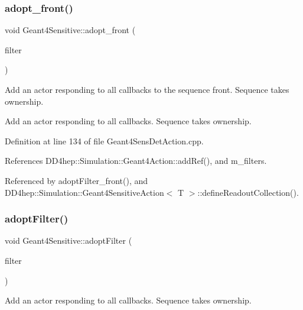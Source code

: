 \subsubsection{\texorpdfstring{adopt\+\_\+front()}{adopt\_front()}}
{\footnotesize\ttfamily void Geant4\+Sensitive\+::adopt\+\_\+front (\begin{DoxyParamCaption}\item[{\hyperlink{class_d_d4hep_1_1_simulation_1_1_geant4_filter}{Geant4\+Filter} $\ast$}]{filter }\end{DoxyParamCaption})}



Add an actor responding to all callbacks to the sequence front. Sequence takes ownership. 

Add an actor responding to all callbacks. Sequence takes ownership. 

Definition at line 134 of file Geant4\+Sens\+Det\+Action.\+cpp.



References D\+D4hep\+::\+Simulation\+::\+Geant4\+Action\+::add\+Ref(), and m\+\_\+filters.



Referenced by adopt\+Filter\+\_\+front(), and D\+D4hep\+::\+Simulation\+::\+Geant4\+Sensitive\+Action$<$ T $>$\+::define\+Readout\+Collection().

\hypertarget{class_d_d4hep_1_1_simulation_1_1_geant4_sensitive_a54a242570db8df04bcf260d2e0ea3018}{}\label{class_d_d4hep_1_1_simulation_1_1_geant4_sensitive_a54a242570db8df04bcf260d2e0ea3018} 
\subsubsection{\texorpdfstring{adopt\+Filter()}{adoptFilter()}}
{\footnotesize\ttfamily void Geant4\+Sensitive\+::adopt\+Filter (\begin{DoxyParamCaption}\item[{\hyperlink{class_d_d4hep_1_1_simulation_1_1_geant4_action}{Geant4\+Action} $\ast$}]{filter }\end{DoxyParamCaption})}



Add an actor responding to all callbacks. Sequence takes ownership. 



